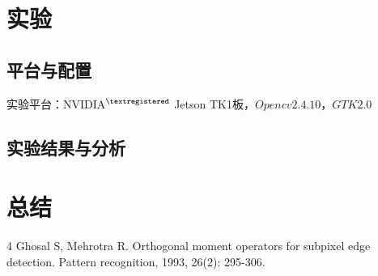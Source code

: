 \documentclass[10pt,a4paper]{article}
\begin{document}
%	
%		




\section{实验}
\subsection{平台与配置}

实验平台：NVIDIA$^{\textregistered}$ Jetson TK1板，$Opencv2.4.10$，$GTK2.0$

\subsection{实验结果与分析}



\section{总结}

\begin{thebibliography}{4}
Ghosal S, Mehrotra R. Orthogonal moment operators for subpixel edge detection. Pattern recognition, 1993, 26(2): 295-306.

\end{thebibliography}
\end{document}
